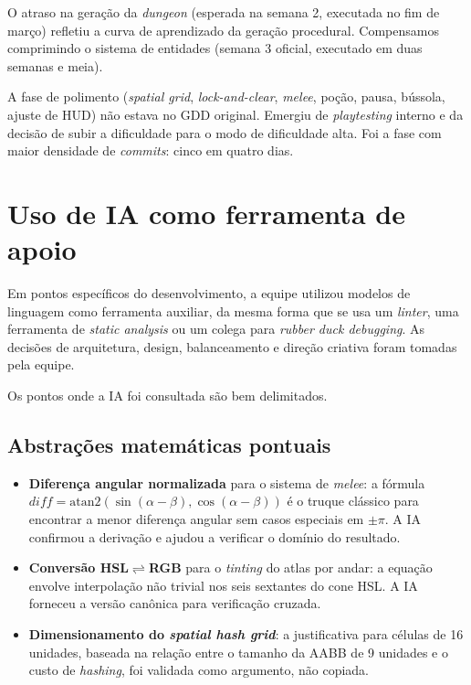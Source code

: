 O atraso na geração da \emph{dungeon} (esperada na semana 2, executada no fim de
março) refletiu a curva de aprendizado da geração procedural. Compensamos
comprimindo o sistema de entidades (semana 3 oficial, executado em duas semanas
e meia).

A fase de polimento (\emph{spatial grid}, \emph{lock-and-clear}, \emph{melee},
poção, pausa, bússola, ajuste de HUD) não estava no GDD original. Emergiu de
\emph{playtesting} interno e da decisão de subir a dificuldade para o modo de
dificuldade alta. Foi a fase com maior densidade de \emph{commits}: cinco em
quatro dias.

\section{Uso de IA como ferramenta de apoio}

Em pontos específicos do desenvolvimento, a equipe utilizou modelos de linguagem
como ferramenta auxiliar, da mesma forma que se usa um \emph{linter}, uma
ferramenta de \emph{static analysis} ou um colega para \emph{rubber duck
debugging}. As decisões de arquitetura, design, balanceamento e direção criativa
foram tomadas pela equipe.

Os pontos onde a IA foi consultada são bem delimitados.

\subsection{Abstrações matemáticas pontuais}

\begin{itemize}
  \item \textbf{Diferença angular normalizada} para o sistema de \emph{melee}: a
    fórmula $\mathit{diff} = \mathrm{atan2}(\sin(\alpha - \beta),
    \cos(\alpha - \beta))$ é o truque clássico para encontrar a menor diferença
    angular sem casos especiais em $\pm\pi$. A IA confirmou a derivação e ajudou
    a verificar o domínio do resultado.
  \item \textbf{Conversão HSL$\rightleftharpoons$RGB} para o \emph{tinting} do
    atlas por andar: a equação envolve interpolação não trivial nos seis
    sextantes do cone HSL. A IA forneceu a versão canônica para verificação
    cruzada.
  \item \textbf{Dimensionamento do \emph{spatial hash grid}}: a justificativa
    para células de 16 unidades, baseada na relação entre o tamanho da AABB de
    9 unidades e o custo de \emph{hashing}, foi validada como argumento, não
    copiada.
\end{itemize}

